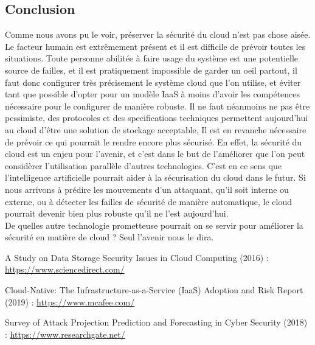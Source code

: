 \documentclass[a4paper, 12pt]{article}
\begin{document}
\begin{spacing}{1.1}
  \section{Conclusion}
    Comme nous avons pu le voir, préserver la sécurité du cloud n'est pas chose
    aisée. Le facteur humain est extrêmement présent et il est difficile de
    prévoir toutes les situations. Toute personne abilitée à faire usage du
    système est une potentielle source de failles, et il est pratiquement
    impossible de garder un oeil partout, il faut donc configurer très
    précisement le système cloud que l'on utilise, et éviter tant que possible
    d'opter pour un modèle IaaS à moins d'avoir les compétences nécessaire pour
    le configurer de manière robuste. Il ne faut néanmoins ne pas être
    pessimiste, des protocoles et des specifications techniques permettent
    aujourd'hui au cloud d'être une solution de stockage acceptable, Il est en
    revanche nécessaire de prévoir ce qui pourrait le rendre encore plus
    sécurisé. En effet, la sécurité du cloud est un enjeu pour l'avenir, et
    c'est dans le but de l'améliorer que l'on peut considèrer l'utilisation
    parallèle d'autres technologies. C'est en ce sens que l'intelligence
    artificielle pourrait aider à la sécurisation du cloud dans le futur. Si
    nous arrivons à prédire les mouvements d'un attaquant, qu'il soit interne ou
    externe, ou à détecter les failles de sécurité de manière automatique, le
    cloud pourrait devenir bien plus robuste qu'il ne l'est aujourd'hui. \\

    De quelles autre technologie prometteuse pourrait on se servir pour
    améliorer la sécurité en matière de cloud ? Seul l'avenir nous le dira.

  \newpage
  \begin{thebibliography}{3}
    A Study on Data Storage Security Issues in Cloud Computing (2016) : \href{https://www.sciencedirect.com/science/article/pii/S1877050916315812}{https://www.sciencedirect.com/}

    Cloud-Native: The Infrastructure-as-a-Service (IaaS) Adoption and Risk
    Report (2019) : \href{https://www.mcafee.com/enterprise/en-us/assets/reports/restricted/rp-cloud-adoption-risk-report-iaas.pdf}{https://www.mcafee.com/}

    Survey of Attack Projection Prediction and Forecasting in Cyber Security
    (2018) : \href{https://www.researchgate.net/publication/327449459_Survey_of_Attack_Projection_Prediction_and_Forecasting_in_Cyber_Security}{https://www.researchgate.net/}


\end{thebibliography}
\end{spacing}
\end{document}
